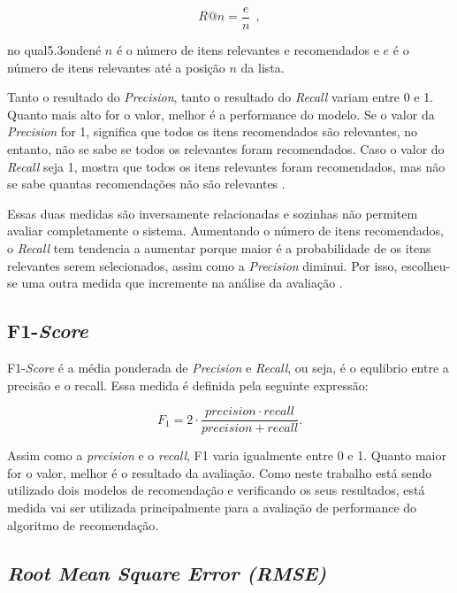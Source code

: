 \begin{equation}
    R@n = \frac{e}{n}~~,
\end{equation}

no qual5.3ondené $n$ é o número de itens relevantes e recomendados e $e$ é o número de itens relevantes até a posição $n$ da lista.

Tanto o resultado do \textit{Precision}, tanto o resultado do \textit{Recall} variam entre 0 e 1. Quanto mais alto for o valor, melhor é a performance do modelo. Se o valor da \textit{Precision} for 1, significa que todos os itens recomendados são relevantes, no entanto, não se sabe se todos os relevantes foram recomendados. Caso o valor do \textit{Recall} seja 1, mostra que todos os itens relevantes foram recomendados, mas não se sabe quantas recomendações não são relevantes \citep{morais2012sistemas}.

Essas duas medidas são inversamente relacionadas e sozinhas não permitem avaliar completamente o sistema. Aumentando o número de itens recomendados, o \textit{Recall} tem tendencia a aumentar porque maior é a probabilidade de os itens relevantes serem selecionados, assim como a \textit{Precision} diminui. Por isso, escolheu-se uma outra medida que incremente na análise da avaliação \citep{morais2012sistemas}.

\subsection{F1-\textit{Score}}

F1-\textit{Score} é a média ponderada de \textit{Precision} e \textit{Recall}, ou seja, é o equlibrio entre a precisão e o recall. Essa medida é definida pela seguinte expressão:

\begin{equation}
    F_1 = 2 \cdot \frac{precision \cdot recall}{precision + recall}.
\end{equation}

Assim como a \textit{precision} e o \textit{recall}, F1 varia igualmente entre 0 e 1. Quanto maior for o valor, melhor é o resultado da avaliação. Como neste trabalho está sendo utilizado dois modelos de recomendação e verificando os seus resultados, está medida vai ser utilizada principalmente para a avaliação de performance do algoritmo de recomendação.

\subsection{\textit{Root Mean Square Error (RMSE)}}

